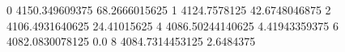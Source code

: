0 4150.349609375 68.2666015625
1 4124.7578125 42.6748046875
2 4106.4931640625 24.41015625
4 4086.50244140625 4.41943359375
6 4082.0830078125 0.0
8 4084.7314453125 2.6484375
